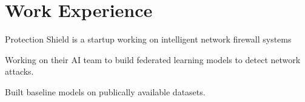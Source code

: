 \documentclass[]{resume-template}
\begin{document}
\begin{minipage}[t]{0.66\textwidth}

    \section{Work Experience}\label{sec:Work Experience}
    \label{subsec:protectionshield}
    \vspace{\topsep}
    \begin{tightemize}
        \item Protection Shield is a startup working on intelligent network firewall systems
        \item Working on their AI team to build federated learning models to detect network attacks.
        \item Built baseline models on publically available datasets.
    \end{tightemize}


\end{minipage}
\end{document}
